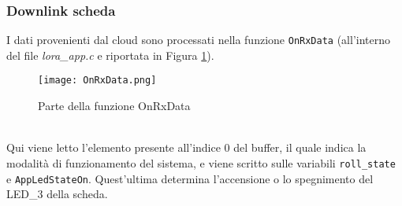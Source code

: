   \subsubsection{Downlink scheda}\label{sssec:downlink_scheda}
  I dati provenienti dal cloud sono processati nella funzione \Verb|OnRxData| (all'interno del file \textit{lora\_app.c} e riportata in Figura \ref{fig:onrxdata}).
  \begin{figure}[h!]
    \centering
    \texttt{[image: OnRxData.png]}
    \caption{Parte della funzione OnRxData}
    \label{fig:onrxdata}
  \end{figure}
  \\Qui viene letto l'elemento presente all'indice 0 del buffer, il quale indica la modalità di funzionamento del sistema, e viene scritto sulle variabili \Verb|roll_state| e \Verb|AppLedStateOn|. Quest'ultima determina l'accensione o lo spegnimento del LED\_3 della scheda.

